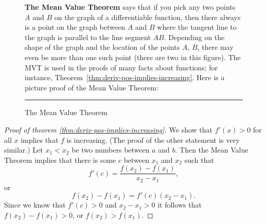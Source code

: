 \begin{figure}[t]\flushleft\sffamily



  \color{darkbluegreen}
  \parbox[b]{0.45\textwidth}{\textbf{The Mean Value Theorem }says that
    if you pick any two points $A$ and $B$ on the graph of a differentiable function,
    then there always is a point on the graph between $A$ and $B$
    where the tangent line to the graph is parallel to the line segment
    $AB$.  Depending on the shape of the graph and the location of the
    points $A$, $B$, there may even be more than one such point (there are two
    in this figure).  The MVT is used in the proofs of many facts
    about functions; for instance,
    Theorem~\ref{thm:deriv-pos-implies-increasing}.  Here is a picture
  proof of the Mean Value Theorem:}
  \hfill
  \parbox[b]{0.4\textwidth}{ }




  \def\mvtprooftextone{%
    \parbox[t]{80pt}{\sffamily\itshape\footnotesize\color{darkbluegreen}%
      To find a point on this curve where the tangent is parallel to
      the chord $AB$, you draw two lines \ldots}}




  \def\mvtprooftexttwo{%
    \parbox[b]{96pt}{\sffamily\itshape\footnotesize\color{darkbluegreen}%
      \ldots parallel to the chord, one far above the graph
      and one far below the graph.  Then, always keeping these lines
      parallel to the chord,  you slide them towards the graph \ldots }}




  \def\mvtprooftextthree{%
    \parbox[b]{96pt}{\sffamily\itshape\footnotesize\color{darkbluegreen}%
      \ldots until they touch the
      graph.  At the points where the lines touch the graph, the
      tangent line to the graph is parallel to the chord $AB$. }}
  
  \def\mvtproofthechord{{\sffamily\itshape\footnotesize\color{darkbluegreen} The
  chord $AB$}}

  




  \caption{The Mean Value Theorem}
  \label{fig:05MeanValueTheorem}
  \rule{\textwidth}{2pt}
\end{figure}








\begin{proof}[Proof of theorem \ref{thm:deriv-pos-implies-increasing}]
  We show that $f'(x)>0$ for all $x$ implies that $f$ is increasing.
  (The proof of the other statement is very similar.)
  Let $x_1<x_2$ be two numbers between $a$ and $b$.  Then the Mean Value Theorem
  implies that there is some $c$ between $x_1$ and $x_2$ such that
  \[
  f'(c) = \frac{f(x_2)-f(x_1)}{x_2-x_1},
  \]
  or
  \[
  f(x_2)-f(x_1) = f'(c) (x_2-x_1).
  \]
  Since we know that $f'(c)>0$ and $x_2-x_1>0$ it follows that
  $f(x_2)-f(x_1)>0$, or $f(x_2)>f(x_1)$.
\end{proof}




